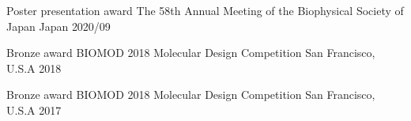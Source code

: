 



\begin{cvhonors}

  \cvhonor
    {Poster presentation award} %
    {The 58th Annual Meeting of the Biophysical Society of Japan} %
    {Japan} %
    {2020/09} %

  \cvhonor
    {Bronze award} %
    {BIOMOD 2018 Molecular Design Competition} %
    {San Francisco, U.S.A} %
    {2018} %

  \cvhonor
    {Bronze award} %
    {BIOMOD 2018 Molecular Design Competition} %
    {San Francisco, U.S.A} %
    {2017} %

\end{cvhonors}

